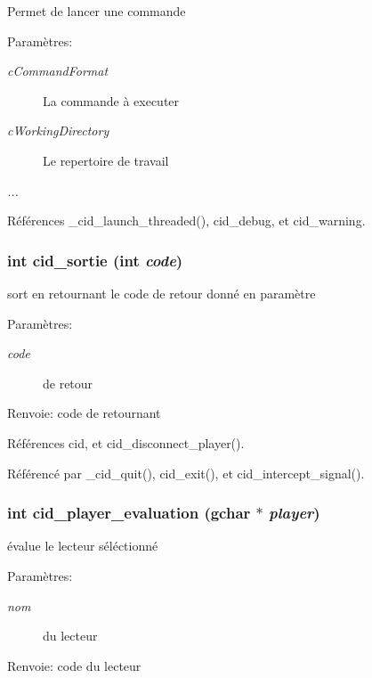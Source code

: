 Permet de lancer une commande \begin{Desc}
\item[Paramètres:]
\begin{description}
\item[{\em cCommandFormat}]La commande à executer \item[{\em cWorkingDirectory}]Le repertoire de travail \item[{\em ...}]\end{description}
\end{Desc}


Références \_\-cid\_\-launch\_\-threaded(), cid\_\-debug, et cid\_\-warning.
\subsubsection{\setlength{\rightskip}{0pt plus 5cm}int cid\_\-sortie (int {\em code})}\label{cid-utilities_8h_0b42fafb55fca67d4be22d8095e5d1b4}


sort en retournant le code de retour donné en paramètre \begin{Desc}
\item[Paramètres:]
\begin{description}
\item[{\em code}]de retour \end{description}
\end{Desc}
\begin{Desc}
\item[Renvoie:]code de retournant \end{Desc}


Références cid, et cid\_\-disconnect\_\-player().

Référencé par \_\-cid\_\-quit(), cid\_\-exit(), et cid\_\-intercept\_\-signal().
\subsubsection{\setlength{\rightskip}{0pt plus 5cm}int cid\_\-player\_\-evaluation (gchar $\ast$ {\em player})}\label{cid-utilities_8h_6cad74bc450444838209d719a3a69cb1}


évalue le lecteur séléctionné \begin{Desc}
\item[Paramètres:]
\begin{description}
\item[{\em nom}]du lecteur \end{description}
\end{Desc}
\begin{Desc}
\item[Renvoie:]code du lecteur \end{Desc}


